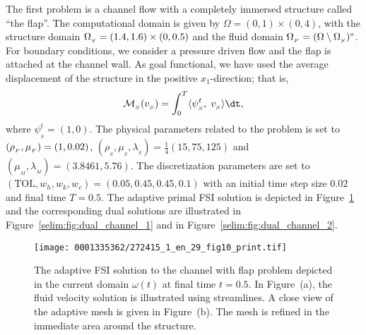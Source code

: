 The first problem is a channel flow with a completely immersed
structure called ``the flap''. The computational domain is given by
$\Omega = (0, 1)\times (0,4)$, with the structure domain $\Omega_{_{S}} = (1.4,
1.6)\times (0, 0.5)$ and the fluid domain $\Omega_{_{F}} = (\Omega\setminus
\Omega_{_{S}})^{\circ}$. For boundary conditions, we consider a pressure driven
flow and the flap is attached at the channel wall. As goal functional,
we have used the average displacement of the structure in the positive
$x_1$-direction; that is,
\begin{equation}
\label{selim:eq:goalfunctional_channel}
\M_{_{S}}(v_{_{S}}) = \int_0^T \langle \psi^t_{_{S}},\;
v_{_{S}}\rangle \dt,
\end{equation}
where $\psi^t_{_{S}} = (1,0)$. The physical parameters related to the
problem is set to $(\rho_{_{F}},\mu_{_{F}}) = (1, 0.02)$,
$(\rho_{_{S}},\mu_{_{S}}, \lambda_{_{S}}) = \tfrac{1}{4}(15, 75, 125)$
and $(\mu_{_{M}}, \lambda_{_{M}}) = (3.8461, 5.76)$. The
discretization parameters are set to $(\mathrm{TOL}, w_h, w_k,w_c) = (0.05, 0.45, 0.45, 0.1)$ with an initial time step size $0.02$ and
final time $T=0.5$. The
adaptive primal FSI solution is depicted in
Figure~\ref{selim:fig:primal_channel} and the corresponding dual
solutions are illustrated in Figure~\ref{selim:fig:dual_channel_1}
and in Figure~\ref{selim:fig:dual_channel_2}.

\begin{figure}[!t]
  \centering
  \texttt{[image: 0001335362/272415\_1\_en\_29\_fig10\_print.tif]}
  \caption{The adaptive FSI solution to the channel with flap problem
     depicted in the current domain $\omega(t)$ at final time
     $t=0.5$. In Figure~(a), the fluid velocity solution
     is illustrated using streamlines. A close view of the adaptive
     mesh is given in Figure~(b). The mesh is refined in
     the immediate area around the structure.}
\label{selim:fig:primal_channel}
\end{figure}

